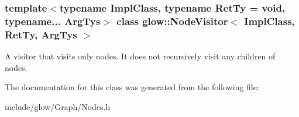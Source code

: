 \subsubsection*{template$<$typename Impl\+Class, typename Ret\+Ty = void, typename... Arg\+Tys$>$\newline
class glow\+::\+Node\+Visitor$<$ Impl\+Class, Ret\+Ty, Arg\+Tys $>$}

A visitor that visits only nodes. It does not recursively visit any children of nodes. 

The documentation for this class was generated from the following file\+:\begin{DoxyCompactItemize}
\item 
include/glow/\+Graph/Nodes.\+h\end{DoxyCompactItemize}
